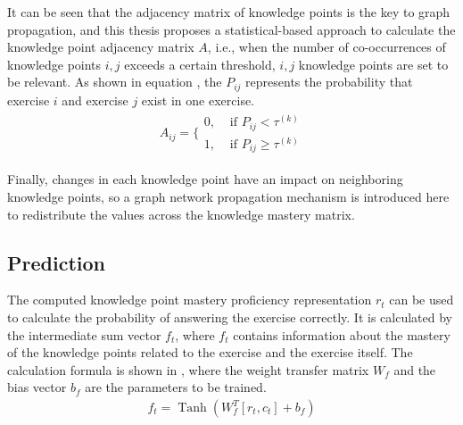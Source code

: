 It can be seen that the adjacency matrix of knowledge points is the key to graph propagation, and this thesis proposes a statistical-based approach to calculate the knowledge point adjacency matrix \(A\), i.e., when the number of co-occurrences of knowledge points \(i,j\) exceeds a certain threshold, \(i,j\) knowledge points are set to be relevant. As shown in equation \eqname{\ref{fml:ch3-confidence}}, the \(P_{ij}\) represents the probability that exercise \(i\) and exercise \(j\) exist in one exercise.
\begin{align}\label{fml:ch3-confidence}
    A_{ij}=\{\begin{array}{ll}
        0, & \text{ if } P_{ij}<\tau^{(k)}      \\
        1, & \text{ if } P_{ij} \geq \tau^{(k)}
    \end{array}
\end{align}


Finally, changes in each knowledge point have an impact on neighboring knowledge points, so a graph network propagation mechanism is introduced here to redistribute the values across the knowledge mastery matrix.






\subsection{Prediction}
The computed knowledge point mastery proficiency representation \(r_t\) can be used to calculate the probability of answering the exercise correctly. It is calculated by the intermediate sum vector \(f_t\), where \(f_t\) contains information about the mastery of the knowledge points related to the exercise and the exercise itself. The calculation formula is shown in \eqname{\ref{fml:ch3-predicting-function-f}}, where the weight transfer matrix \(W_f\) and the bias vector \(b_f\) are the parameters to be trained.
\begin{align}\label{fml:ch3-predicting-function-f}
    f_t = \operatorname{Tanh}(W_f^T[r_t,c_t] + b_f)
\end{align}

